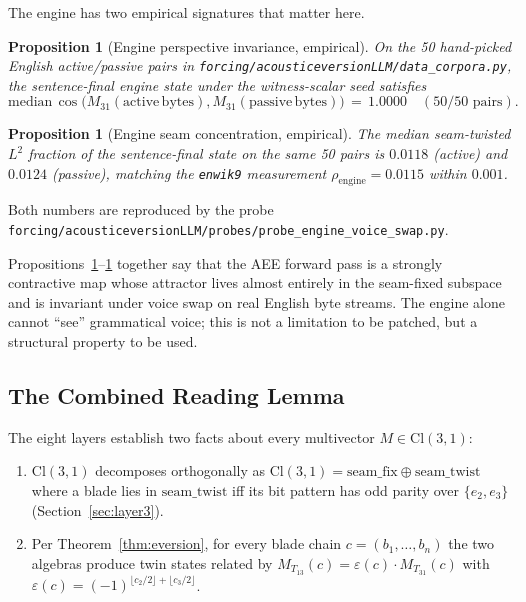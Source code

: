\documentclass[11pt,a4paper]{article}
\theoremstyle{plain}
\newtheorem{proposition}[theorem]{Proposition}
\theoremstyle{definition}
\theoremstyle{remark}
\numberwithin{equation}{section}
\providecommand{\Cl}{\mathrm{Cl}}
\providecommand{\eps}{\varepsilon}
\begin{document}
The engine has two empirical signatures that matter here.

\begin{proposition}[Engine perspective invariance, empirical]
\label{prop:engine-invariance}
On the 50 hand-picked English active/passive pairs in
\texttt{forcing/acousticeversionLLM/data\_corpora.py}, the
sentence-final engine state under the witness-scalar seed
satisfies
\[
  \mathrm{median} \, \cos\bigl(M_{31}(\mathrm{active\,bytes}),
                                M_{31}(\mathrm{passive\,bytes})\bigr)
   \,=\, 1.0000
   \quad (50/50 \text{ pairs}).
\]
\end{proposition}

\begin{proposition}[Engine seam concentration, empirical]
\label{prop:engine-seam}
The median seam-twisted $L^2$ fraction of the sentence-final state
on the same 50 pairs is $0.0118$ (active) and $0.0124$ (passive),
matching the \texttt{enwik9} measurement
$\rho_{\mathrm{engine}} = 0.0115$ within $0.001$.
\end{proposition}

Both numbers are reproduced by the probe
\texttt{forcing/acousticeversionLLM/probes/probe\_engine\_voice\_swap.py}.

Propositions~\ref{prop:engine-invariance}--\ref{prop:engine-seam}
together say that the AEE forward pass is a strongly contractive
map whose attractor lives almost entirely in the seam-fixed
subspace and is invariant under voice swap on real English byte
streams.  The engine alone cannot ``see'' grammatical voice; this
is not a limitation to be patched, but a structural property to be
used.

\subsection{The Combined Reading Lemma}\label{sec:crl}

The eight layers establish two facts about every multivector
$M \in \Cl(3,1)$:
\begin{enumerate}
\item[(a)] $\Cl(3,1)$ decomposes orthogonally as
$\Cl(3,1) = \mathrm{seam\_fix} \oplus \mathrm{seam\_twist}$
where a blade lies in $\mathrm{seam\_twist}$ iff its bit pattern
has odd parity over $\{e_2, e_3\}$ (Section~\ref{sec:layer3}).
\item[(b)] Per Theorem~\ref{thm:eversion}, for every blade chain
$c = (b_1, \dots, b_n)$ the two algebras produce twin states
related by $M_{T_{13}}(c) = \eps(c) \cdot M_{T_{31}}(c)$ with
$\eps(c) = (-1)^{\lfloor c_2/2 \rfloor + \lfloor c_3/2 \rfloor}$.
\end{enumerate}
\end{document}
